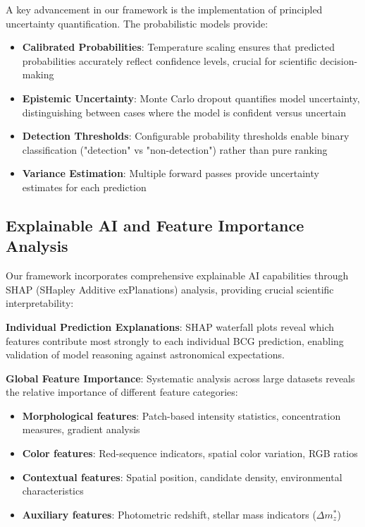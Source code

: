 \documentclass[twocolumn,10pt]{aastex631}
\begin{document}
A key advancement in our framework is the implementation of principled uncertainty quantification. The probabilistic models provide:

\begin{itemize}
\item \textbf{Calibrated Probabilities}: Temperature scaling ensures that predicted probabilities accurately reflect confidence levels, crucial for scientific decision-making
\item \textbf{Epistemic Uncertainty}: Monte Carlo dropout quantifies model uncertainty, distinguishing between cases where the model is confident versus uncertain
\item \textbf{Detection Thresholds}: Configurable probability thresholds enable binary classification ("detection" vs "non-detection") rather than pure ranking
\item \textbf{Variance Estimation}: Multiple forward passes provide uncertainty estimates for each prediction
\end{itemize}

\subsection{Explainable AI and Feature Importance Analysis}

Our framework incorporates comprehensive explainable AI capabilities through SHAP (SHapley Additive exPlanations) analysis, providing crucial scientific interpretability:

\textbf{Individual Prediction Explanations}: SHAP waterfall plots reveal which features contribute most strongly to each individual BCG prediction, enabling validation of model reasoning against astronomical expectations.

\textbf{Global Feature Importance}: Systematic analysis across large datasets reveals the relative importance of different feature categories:
\begin{itemize}
\item \textbf{Morphological features}: Patch-based intensity statistics, concentration measures, gradient analysis
\item \textbf{Color features}: Red-sequence indicators, spatial color variation, RGB ratios
\item \textbf{Contextual features}: Spatial position, candidate density, environmental characteristics  
\item \textbf{Auxiliary features}: Photometric redshift, stellar mass indicators ($\Delta m^*_z$)
\end{itemize}
\end{document}
